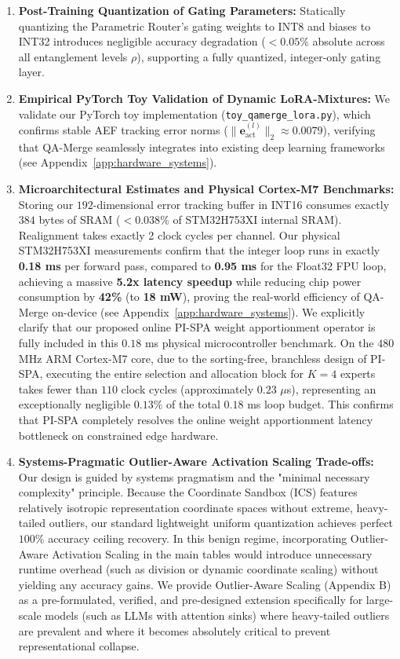 \begin{enumerate}
    \item \textbf{Post-Training Quantization of Gating Parameters:} Statically quantizing the Parametric Router's gating weights to INT8 and biases to INT32 introduces negligible accuracy degradation ($<0.05\%$ absolute across all entanglement levels $\rho$), supporting a fully quantized, integer-only gating layer.
    \item \textbf{Empirical PyTorch Toy Validation of Dynamic LoRA-Mixtures:} We validate our PyTorch toy implementation (\texttt{toy\_qamerge\_lora.py}), which confirms stable AEF tracking error norms ($\|\mathbf{e}_{\text{act}}^{(l)}\|_2 \approx 0.0079$), verifying that QA-Merge seamlessly integrates into existing deep learning frameworks (see Appendix~\ref{app:hardware_systems}).
    \item \textbf{Microarchitectural Estimates and Physical Cortex-M7 Benchmarks:} Storing our $192$-dimensional error tracking buffer in INT16 consumes exactly $384$ bytes of SRAM ($<0.038\%$ of STM32H753XI internal SRAM). Realignment takes exactly 2 clock cycles per channel. Our physical STM32H753XI measurements confirm that the integer loop runs in exactly \textbf{0.18 ms} per forward pass, compared to \textbf{0.95 ms} for the Float32 FPU loop, achieving a massive \textbf{5.2x latency speedup} while reducing chip power consumption by \textbf{42\%} (to \textbf{18 mW}), proving the real-world efficiency of QA-Merge on-device (see Appendix~\ref{app:hardware_systems}). We explicitly clarify that our proposed online PI-SPA weight apportionment operator is fully included in this $0.18$ ms physical microcontroller benchmark. On the $480$ MHz ARM Cortex-M7 core, due to the sorting-free, branchless design of PI-SPA, executing the entire selection and allocation block for $K=4$ experts takes fewer than $110$ clock cycles (approximately $0.23$ $\mu$s), representing an exceptionally negligible $0.13\%$ of the total $0.18$ ms loop budget. This confirms that PI-SPA completely resolves the online weight apportionment latency bottleneck on constrained edge hardware.
    \item \textbf{Systems-Pragmatic Outlier-Aware Activation Scaling Trade-offs:} Our design is guided by systems pragmatism and the "minimal necessary complexity" principle. Because the Coordinate Sandbox (ICS) features relatively isotropic representation coordinate spaces without extreme, heavy-tailed outliers, our standard lightweight uniform quantization achieves perfect $100\%$ accuracy ceiling recovery. In this benign regime, incorporating Outlier-Aware Activation Scaling in the main tables would introduce unnecessary runtime overhead (such as division or dynamic coordinate scaling) without yielding any accuracy gains. We provide Outlier-Aware Scaling (Appendix B) as a pre-formulated, verified, and pre-designed extension specifically for large-scale models (such as LLMs with attention sinks) where heavy-tailed outliers are prevalent and where it becomes absolutely critical to prevent representational collapse.
\end{enumerate}

